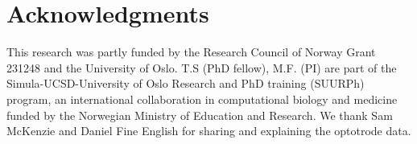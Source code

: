 \documentclass[11pt]{article}
\begin{document}
\section{Acknowledgments}
This research was partly funded by the Research Council of Norway Grant 231248 and the University of Oslo.
T.S (PhD fellow), M.F. (PI) are part of the Simula-UCSD-University of Oslo Research
and PhD training (SUURPh) program, an international collaboration in computational biology and
medicine funded by the Norwegian Ministry of Education and Research.
We thank Sam McKenzie and Daniel Fine English for sharing and explaining the optotrode data.
\pagestyle{empty}

{\footnotesize\linespread{1}
}
\end{document}

